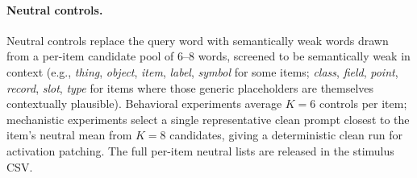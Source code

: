 \documentclass[11pt]{article}
\begin{document}
\paragraph{Neutral controls.}
Neutral controls replace the query word with semantically weak words drawn from a per-item
candidate pool of $6$--$8$ words, screened to be semantically weak in context (e.g.,
\emph{thing}, \emph{object}, \emph{item}, \emph{label}, \emph{symbol} for some items;
\emph{class}, \emph{field}, \emph{point}, \emph{record}, \emph{slot}, \emph{type} for items
where those generic placeholders are themselves contextually plausible). Behavioral
experiments average $K{=}6$ controls per item; mechanistic experiments select a single
representative clean prompt closest to the item's neutral mean from $K{=}8$ candidates,
giving a deterministic clean run for activation patching. The full per-item neutral lists
are released in the stimulus CSV.
\end{document}
